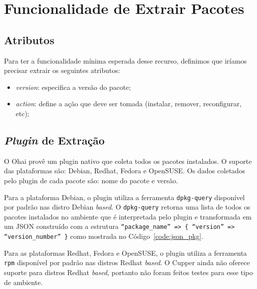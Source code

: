 \section{Funcionalidade de Extrair Pacotes}
\label{sec:pacotes}

\subsection{Atributos}
Para ter a funcionalidade mínima esperada desse recurso, definimos que iríamos
precisar extrair os seguintes atributos:

\begin{itemize}
  \item \textit{version}: especifica a versão do pacote;
  \item \textit{action}: define a ação que deve ser tomada
    (instalar, remover, reconfigurar, etc);
\end{itemize}

\subsection{\textit{Plugin} de Extração}

O Ohai provê um plugin nativo que coleta todos os pacotes instalados. O suporte
das plataformas são: Debian, Redhat, Fedora e OpenSUSE\@. Os dados coletados pelo
plugin de cada pacote são: nome do pacote e versão.

Para a plataforma Debian, o plugin utiliza a ferramenta \texttt{dpkg-query} disponível
por padrão nas distro Debian \textit{based}. O \texttt{dpkg-query} retorna uma lista de todos os pacotes
instalados no ambiente que é interpretada pelo plugin e transformada em um JSON
construído com a estrutura \texttt{``package\_name'' => \{ ``version'' => ``version\_number'' \}}
como mostrada no Código~\ref{code:json_pkg}.

\noindent\begin{minipage}{\textwidth}
  \lstset{style=shell}
  
\end{minipage}\hfill

Para as plataformas Redhat, Fedora e OpenSUSE, o plugin utiliza a ferramenta \texttt{rpm}
disponível por padrão nas distros Redhat \textit{based}. O Cupper ainda não oferece suporte
para distros Redhat \textit{based}, portanto não foram feitos testes para esse tipo de ambiente.

